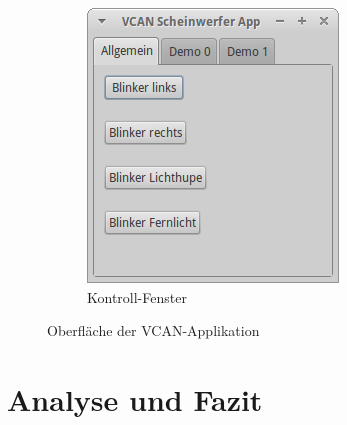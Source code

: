 \documentclass[]{beamer}
\begin{document}
\begin{frame}
\begin{figure}
\begin{subfigure}[b]{0.39\textwidth}
            \includegraphics[width=\textwidth]{vcan_app_control}
            \caption{Kontroll-Fenster}
            \label{fig:vcan_app_control}
        \end{subfigure}
        \caption{Oberfläche der VCAN-Applikation}
        \label{fig:vcan_app}
    \end{figure}
\end{frame}





\section{Analyse und Fazit}
\label{sec:analyse_fazit}

\end{document}
